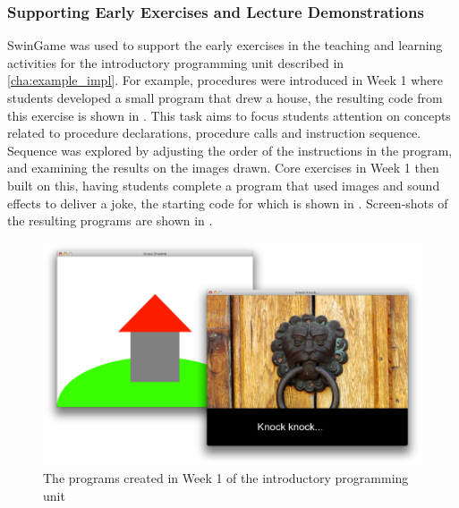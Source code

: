 \subsubsection{Supporting Early Exercises and Lecture Demonstrations} %
\label{sub:supporting_early_exercises}

SwinGame was used to support the early exercises in the teaching and learning activities for the introductory programming unit described in \cref{cha:example_impl}. For example, procedures were introduced in Week 1 where students developed a small program that drew a house, the resulting code from this exercise is shown in . This task aims to focus students attention on concepts related to procedure declarations, procedure calls and instruction sequence. Sequence was explored by adjusting the order of the instructions in the program, and examining the results on the images drawn. Core exercises in Week 1 then built on this, having students complete a program that used images and sound effects to deliver a joke, the starting code for which is shown in . Screen-shots of the resulting programs are shown in .



\begin{figure}[thb]
  \centering
  \includegraphics[width=\textwidth]{Week1Progs}
  \caption{The programs created in Week 1 of the introductory programming unit}
  \label{fig:week1_progs}
\end{figure}

